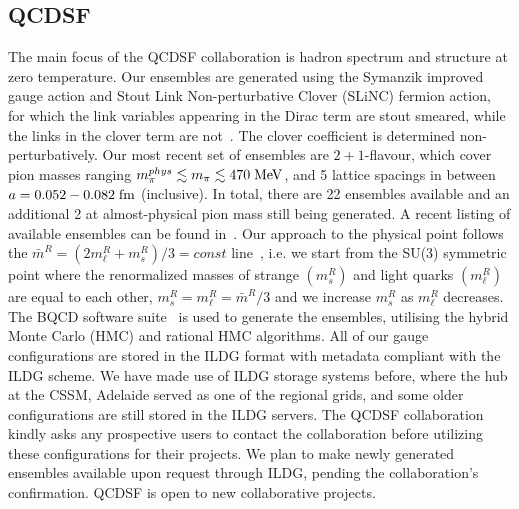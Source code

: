 \documentclass[a4paper,11pt]{article}
\begin{document}
\subsection{QCDSF}
The main focus of the QCDSF collaboration is hadron spectrum and
structure at zero temperature.
%
%
Our ensembles are generated using the Symanzik improved gauge action
and Stout Link Non-perturbative Clover (SLiNC) fermion action, for
which the link variables appearing in the Dirac term are stout
smeared, while the links in the clover term are
not~\cite{Cundy:2009yy}. The clover coefficient is determined
non-perturbatively.
%
Our most recent set of ensembles are $2+1$-flavour, which cover pion
masses ranging $m_\pi^{phys} \lesssim m_\pi \lesssim 470 \; {\rm
  MeV}$, and 5 lattice spacings in between $a = 0.052 - 0.082 \; {\rm
  fm}$ (inclusive).
%
In total, there are 22 ensembles available and an additional 2 at
almost-physical pion mass still being generated. A recent listing of
available ensembles can be found in~\cite{QCDSFUKQCDCSSM:2023qlx}.
%
Our approach to the physical point follows the $\bar m^R = (2m_\ell^R
+ m_s^R)/3 = const$ line~\cite{Bietenholz:2011qq}, i.e. we start from
the SU(3) symmetric point where the renormalized masses of strange
$(m_s^R)$ and light quarks $(m_\ell^R)$ are equal to each other,
$m_s^R = m_\ell^R = \bar m^R/3$ and we increase $m_s^R$ as $m_\ell^R$
decreases.
%
%
The BQCD software suite~\cite{Haar:2017ubh} is used to generate the
ensembles, utilising the hybrid Monte Carlo (HMC) and rational HMC
algorithms.
%
%
All of our gauge configurations are stored in the ILDG format with
metadata compliant with the ILDG scheme. We have made use of ILDG
storage systems before, where the hub at the CSSM, Adelaide served as
one of the regional grids, and some older configurations are still
stored in the ILDG servers.
%
%
The QCDSF collaboration kindly asks any prospective users to contact
the collaboration before utilizing these configurations for their
projects. We plan to make newly generated ensembles available upon
request through ILDG, pending the collaboration's confirmation. QCDSF
is open to new collaborative projects.


\end{document}
